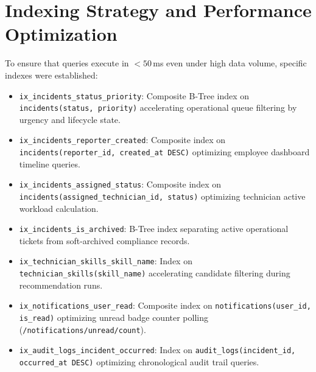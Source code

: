 \documentclass[11pt,a4paper,oneside]{report}
\begin{document}
\section{Indexing Strategy and Performance Optimization}
\label{sec:db_indexing}
To ensure that queries execute in $< 50$\,ms even under high data volume, specific indexes were established:
\begin{itemize}
    \item \texttt{ix\_incidents\_status\_priority}: Composite B-Tree index on \texttt{incidents(status, priority)} accelerating operational queue filtering by urgency and lifecycle state.
    \item \texttt{ix\_incidents\_reporter\_created}: Composite index on \texttt{incidents(reporter\_id, created\_at DESC)} optimizing employee dashboard timeline queries.
    \item \texttt{ix\_incidents\_assigned\_status}: Composite index on \texttt{incidents(assigned\_technician\_id, status)} optimizing technician active workload calculation.
    \item \texttt{ix\_incidents\_is\_archived}: B-Tree index separating active operational tickets from soft-archived compliance records.
    \item \texttt{ix\_technician\_skills\_skill\_name}: Index on \texttt{technician\_skills(skill\_name)} accelerating candidate filtering during recommendation runs.
    \item \texttt{ix\_notifications\_user\_read}: Composite index on \texttt{notifications(user\_id, is\_read)} optimizing unread badge counter polling (\texttt{/notifications/unread/count}).
    \item \texttt{ix\_audit\_logs\_incident\_occurred}: Index on \texttt{audit\_logs(incident\_id, occurred\_at DESC)} optimizing chronological audit trail queries.
\end{itemize}
\end{document}
